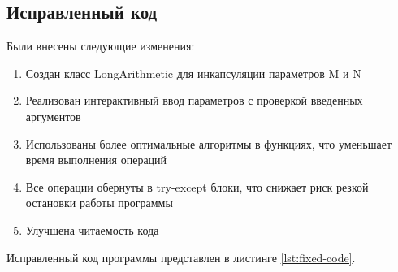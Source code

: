 \documentclass{article}[14pt]
\begin{document}
\subsection{Исправленный код}

Были внесены следующие изменения:

\begin{enumerate}
	\item Создан класс LongArithmetic для инкапсуляции параметров M и N
	\item Реализован интерактивный ввод параметров с проверкой введенных аргументов
	\item Использованы более оптимальные алгоритмы в функциях, что уменьшает время выполнения операций
	\item Все операции обернуты в try-except блоки, что снижает риск резкой остановки работы программы
	\item Улучшена читаемость кода
\end{enumerate}

Исправленный код программы представлен в листинге \ref{lst:fixed-code}.
\end{document}
